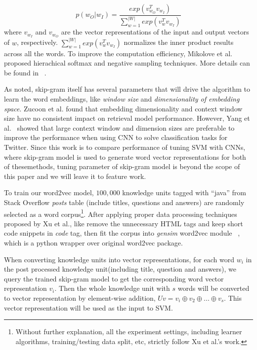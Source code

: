 \begin{equation*}
p(w_O|w_I) = \frac{exp(v_{w_O}^Tv_{w_I})}{\sum_{w=1}^{|W|}exp(v_{w}^Tv_{w_I})}
\end{equation*}
where $v_{w_I}$ and $v_{w_O}$ are the vector representations of the input and output vectors of $w$, respectively. 
$\sum_{w=1}^{|W|}exp(v_{w}^Tv_{w_I})$  normalizes the inner product results across all the words.
To improve the computation efficiency, Mikolove et al. \cite{mikolov2013distributed} proposed
hierachical softmax and negative sampling
techniques. More details can be found in ~\cite{mikolov2013distributed}.

As noted, skip-gram itself has several parameters that will drive the algorithm 
to learn the word embeddings,  like {\it window size} and {\it dimensionality of embedding space}. 
Zucoon et al. \cite{zuccon2015integrating} found that embedding dimensionality
and context window size have no consistent impact on retrieval model performance. However,
Yang et al.~\cite{yang2016using} showed that large context window and dimension
 sizes are preferable to improve the performance when using CNN to solve  classification tasks
 for Twitter. Since this work is to compare performance of  tuning SVM  with CNNs, where
 skip-gram model is used to generate word vector representations for both of thesemethods, 
 tuning parameter of skip-gram model is beyond the scope of this paper and we will leave it to feature work.
 
 

To train our word2vec model, $100,000$ knowledge units tagged with ``java'' from
Stack Overflow {\it posts} table  (include titles, questions and answers)
are randomly selected as a word corpus\footnote{Without further explanation, 
all the experiment settings, including learner algorithms,
training/testing data split, etc, strictly follow Xu et al.'s work. }. 
After applying proper data processing techniques proposed by Xu et al., like
 remove the unnecessary HTML tags and keep short code snippets in
{\it code} tag, then fit the corpus into {\it gensim} word2vec module ~\cite{rehurek_lrec},
which is a python wrapper over original word2vec package.

When converting knowledge units into vector representations, 
for each word $w_i$ in the post processed knowledge unit(including title, question and answers),
we query the trained skip-gram model to get the corresponding word vector representation $v_i$.
Then the whole knowledge unit with $s$ words
will be converted to vector representation by element-wise addition, $Uv = v_i \oplus v_2 \oplus...\oplus v_s $. 
This vector representation will be used
as the input to SVM.




